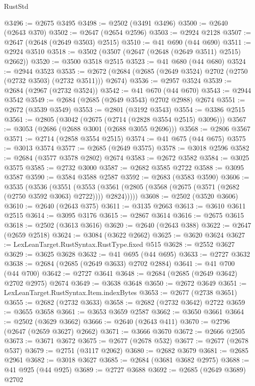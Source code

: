 \begin{lexlean}{RustStd}
\begin{coremodule}
@3496 := @2675 @3495
@3498 := @2502 (@3491 @3496)
@3500 := @2640 (@2643 @370)
@3502 := @2647 (@2654 @2596)
@3503 := @2924 @2128
@3507 := @2647 (@2648 (@2649 @3503) @2515)
@3510 := @41 @690 (@44 @690)
@3511 := @2924 @3510
@3518 := @3502 (@3507 (@2647 (@2648 (@2649 @3511) @2515) @2662))
@3520 := @3500 @3518 @2515
@3523 := @41 @680 (@44 @680)
@3524 := @2944 @3523
@3535 := @2672 (@2684 (@2685 (@2649 @3524) @2702 (@2750 (@2732 @3503) (@2732 @3511))) @2674)
@3536 := @2957 @3524
@3539 := @2684 (@2967 (@2732 @3524))
@3542 := @41 @670 (@44 @670)
@3543 := @2944 @3542
@3549 := @2684 (@2685 (@2649 @3543) @2702 @2988) @2674
@3551 := @2672 (@3539 @3549)
@3553 := @2801 (@3192 @3543)
@3554 := @3386 @2515
@3561 := @2805 (@3042 (@2675 (@2714 (@2828 @3554 @2515) @3096)))
@3567 := @3053 (@2686 (@2688 @3001 (@2688 @3055 @2696)))
@3568 := @2806 @3567
@3571 := @2714 (@2858 @3554 @2515)
@3574 := @41 @675 (@44 @675)
@3575 := @3013 @3574
@3577 := @2685 (@2649 @3575)
@3578 := @3018 @2596
@3582 := @2684 (@3577 @3578 @2802) @2674
@3583 := @2672 @3582
@3584 := @3025 @3575
@3585 := @2732 @3000
@3587 := @2682 @3585 @2722
@3588 := @3095 @3587
@3590 := @3584 @3588 @2587
@3592 := @2683 (@3583 @3590)
@3606 := @3535
    (@3536
      (@3551
        (@3553 (@3561 (@2805 (@3568 (@2675 (@3571 (@2682 (@2750 @3592 @3063) @2722)))) @2824)))))
@3608 := @2502 (@3520 @3606)
@3610 := @2640 (@2643 @375)
@3611 := @3135 @2663
@3613 := @3610 @3611 @2515
@3614 := @3095 @3176
@3615 := @2867 @3614
@3616 := @2675 @3615
@3618 := @2502 (@3613 @3616)
@3620 := @2640 (@2643 @388)
@3622 := @2647 (@2659 @2518)
@3624 := @3084 (@3622 @2662)
@3625 := @3620 @3624
@3627 := LexLeanTarget.RustSyntax.RustType.fixed @515
@3628 := @2552 @3627
@3629 := @3625 @3628
@3632 := @41 @695 (@44 @695)
@3633 := @2727 @3632
@3638 := @2684 (@2685 (@2649 @3633) @2702 @2884)
@3641 := @41 @700 (@44 @700)
@3642 := @2727 @3641
@3648 := @2684 (@2685 (@2649 @3642) @2702 @2975) @2674
@3649 := @3638 @3648
@3650 := @2672 @3649
@3651 := LexLeanTarget.RustSyntax.Item.indexBytes
@3653 := @2677 (@2738 @3651)
@3655 := @2682 (@2732 @3633)
@3658 := @2682 (@2732 @3642) @2722
@3659 := @3655 @3658
@3661 := @3653 @3659 @2587
@3662 := @3650 @3661
@3664 := @2502 (@3629 @3662)
@3666 := @2640 (@2643 @411)
@3670 := @2796 (@2647 (@2659 @3627) @2662)
@3671 := @3666 @3670
@3672 := @2666 @2505
@3673 := @3671 @3672
@3675 := @2677 (@2678 @532)
@3677 := @2677 (@2678 @537)
@3679 := @2751 (@3117 @2062)
@3680 := @2682 @3679
@3681 := @2685 @2961
@3682 := @3018 @3627
@3685 := @2684 (@3681 @3682 @2975)
@3688 := @41 @925 (@44 @925)
@3689 := @2727 @3688
@3692 := @2685 (@2649 @3689) @2702

\end{coremodule}
\end{lexlean}
